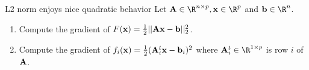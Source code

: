 \documentclass[./some_latex_template.tex]{subfiles}
\begin{document}
\begin{problembox}{L2 norm enjoys nice quadratic behavior}{}
Let $\bA \in \R^{n \times p}, \bx \in \R^{p}$ and $\bb \in \R^n$.
\begin{enumerate}
	\item Compute the gradient of $F(\mathbf{x}) = \frac{1}{2}||\mathbf{A}\mathbf{x} - \mathbf{b}||^2_2$.
	\item Compute the gradient of $f_i(\mathbf{x}) = \frac{1}{2} (\mathbf{A}_i^t \mathbf{x} - \mathbf{b}_i)^2$ where $\bA_i^t \in \R^{1 \times p}$ is row $i$ of $\mathbf{A}$. 
\end{enumerate}
\end{problembox}



\end{document}
